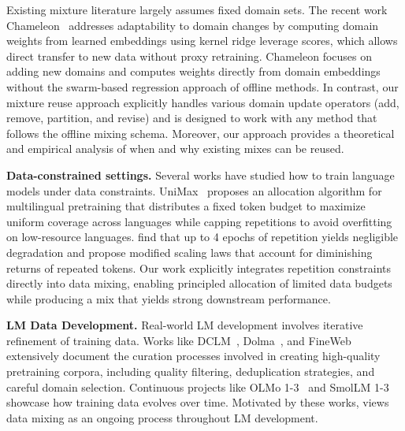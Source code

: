 Existing mixture literature largely assumes fixed domain sets. The recent work Chameleon~\citep{xie2025chameleonflexibledatamixingframework} addresses adaptability to domain changes by computing domain weights from learned embeddings using kernel ridge leverage scores, which allows direct transfer to new data without proxy retraining. Chameleon focuses on adding new domains and computes weights directly from domain embeddings without the swarm-based regression approach of offline methods. In contrast, our mixture reuse approach explicitly handles various domain update operators (add, remove, partition, and revise) and is designed to work with any method that follows the offline mixing schema. Moreover, our approach provides a theoretical and empirical analysis of when and why existing mixes can be reused.



\textbf{Data-constrained settings.} Several works have studied how to train language models under data constraints. UniMax~\citep{chung2023unimaxfairereffectivelanguage} proposes an allocation algorithm for multilingual pretraining that distributes a fixed token budget to maximize uniform coverage across languages while capping repetitions to avoid overfitting on low-resource languages. \citet{muennighoff2025scalingdataconstrainedlanguagemodels} find that up to 4 epochs of repetition yields negligible degradation and propose modified scaling laws that account for diminishing returns of repeated tokens. Our work explicitly integrates repetition constraints directly into data mixing, enabling principled allocation of limited data budgets while producing a mix that yields strong downstream performance.

\textbf{LM Data Development.} Real-world LM development involves iterative refinement of training data. Works like DCLM~\citep{dclm}, Dolma~\citep{soldaini2024dolma}, and FineWeb~\citep{penedo2024fineweb} extensively document the curation processes involved in creating high-quality pretraining corpora, including quality filtering, deduplication strategies, and careful domain selection. Continuous projects like OLMo 1-3~\citep{Groeneveld2024OLMoAT, olmo20242olmo2furious, olmo2025olmo3} and SmolLM 1-3~\citep{allal2024smollm, allal2025smollm2smolgoesbig, bakouch2025smollm3} showcase how training data evolves over time. Motivated by these works, \olmix views data mixing as an ongoing process throughout LM development.
